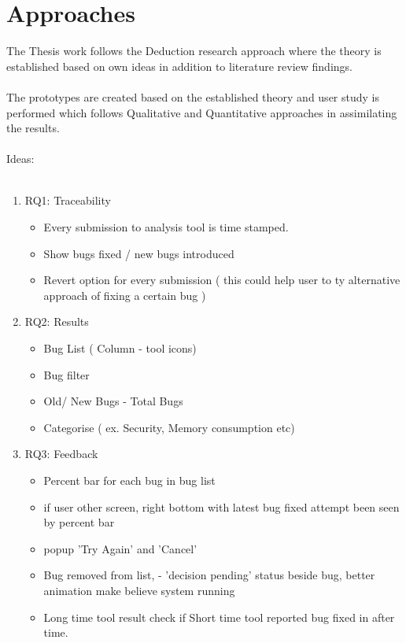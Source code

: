 \chapter{Approaches}
\label{ch:approaches}

The Thesis work follows the Deduction research approach where the theory is established based on own ideas in addition to literature review findings. \\ \\

The prototypes are created based on the established theory and user study is performed which follows Qualitative and Quantitative approaches in assimilating the results. \\ \\  

Ideas: \\ \\

\begin{enumerate}
	\item RQ1: Traceability

\begin{itemize}
	\item Every submission to analysis tool is time stamped.
	\item Show bugs fixed / new bugs introduced
	\item  Revert option for every submission ( this could help user to ty alternative approach of fixing a certain bug )
\end{itemize}

\item RQ2: Results

\begin{itemize}
	\item Bug List ( Column - tool icons)
	\item Bug filter
	\item Old/ New Bugs - Total Bugs
	\item Categorise ( ex. Security, Memory consumption etc)
\end{itemize}

\item RQ3: Feedback

\begin{itemize}
	\item Percent bar for each bug in bug list
	\item if user other screen, right bottom with latest bug fixed attempt been seen by percent bar
	\item popup 'Try Again' and 'Cancel'
	\item Bug removed from list, - 'decision pending' status beside bug, better animation make believe system running
	\item Long time tool result check if Short time tool reported bug fixed in after time.
\end{itemize}

\end{enumerate}